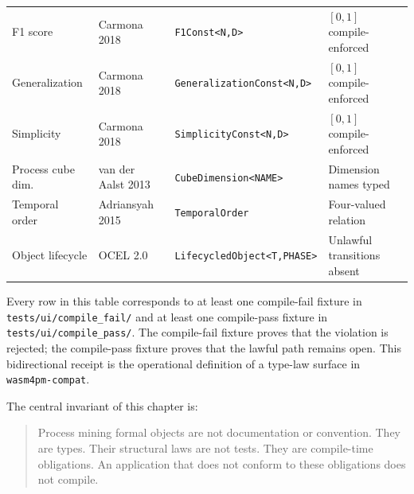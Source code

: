 \begin{table}[ht]
\begin{tabular}{@{}p{2.8cm}p{2.6cm}p{3.2cm}p{3.2cm}@{}}
F1 score            & Carmona 2018 \cite{carmona2018conformance} & \texttt{F1Const<N,D>}               & $[0,1]$ compile-enforced \\
Generalization      & Carmona 2018 \cite{carmona2018conformance} & \texttt{GeneralizationConst<N,D>}   & $[0,1]$ compile-enforced \\
Simplicity          & Carmona 2018 \cite{carmona2018conformance} & \texttt{SimplicityConst<N,D>}       & $[0,1]$ compile-enforced \\
Process cube dim.   & van der Aalst 2013 \cite{vanderaalst2013processcubes} & \texttt{CubeDimension<NAME>} & Dimension names typed \\
Temporal order      & Adriansyah 2015 \cite{adriansyah2015measuring} & \texttt{TemporalOrder}         & Four-valued relation \\
Object lifecycle    & OCEL 2.0 \cite{berti2023ocel20}         & \texttt{LifecycledObject<T,PHASE>}     & Unlawful transitions absent \\
\bottomrule
\end{tabular}
\end{table}

Every row in this table corresponds to at least one compile-fail fixture in
\texttt{tests/ui/compile\_fail/} and at least one compile-pass fixture in
\texttt{tests/ui/compile\_pass/}. The compile-fail fixture proves that the violation is
rejected; the compile-pass fixture proves that the lawful path remains open. This
bidirectional receipt is the operational definition of a type-law surface in
\texttt{wasm4pm-compat}.

The central invariant of this chapter is:

\begin{quote}
Process mining formal objects are not documentation or convention. They are types. Their
structural laws are not tests. They are compile-time obligations. An application that does
not conform to these obligations does not compile.
\end{quote}
